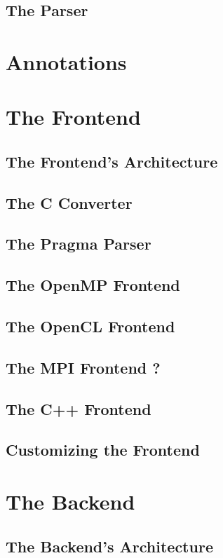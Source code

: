 \subsection{The Parser}

\section{Annotations}

\section{The Frontend}
\subsection{The Frontend's Architecture}
\subsection{The C Converter}
\subsection{The Pragma Parser}
\subsection{The OpenMP Frontend}
\subsection{The OpenCL Frontend}
\subsection{The MPI Frontend ?}
\subsection{The C++ Frontend}
\subsection{Customizing the Frontend}

\section{The Backend}
\subsection{The Backend's Architecture}
